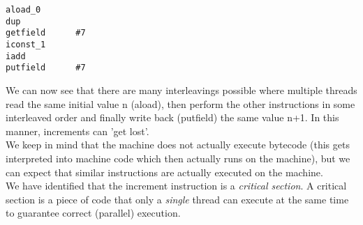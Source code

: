 \documentclass[main.tex]{subfiles}
\begin{document}
\begin{verbatim}
aload_0
dup
getfield      #7
iconst_1
iadd
putfield      #7
\end{verbatim}
We can now see that there are many interleavings possible where multiple threads read the same initial value n (aload), then perform the other instructions in some interleaved order and finally write back (putfield) the same value n+1. In this manner, increments can 'get lost'.\\
We keep in mind that the machine does not actually execute bytecode (this gets interpreted into machine code which then actually runs on the machine), but we can expect that similar instructions are actually executed on the machine.\\[3mm]
We have identified that the increment instruction is a \textit{critical section}. A critical section is a piece of code that only a \textit{single} thread can execute at the same time to guarantee correct (parallel) execution.
\end{document}
